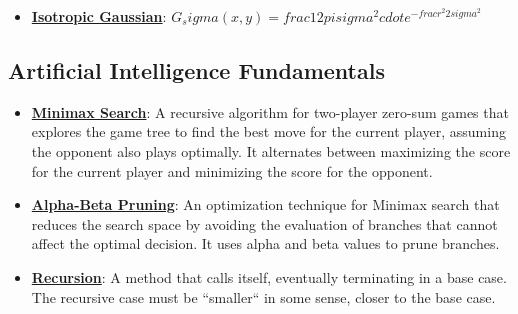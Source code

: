 \documentclass{article}%
\begin{document}
\begin{itemize}[leftmargin=*]
\item \href{https://purdue.brightspace.com/d2l/common/assets/pdfjs-d2l-dist/1.0.14-legacy/web/viewer.html?file=\%2Fcontent\%2Fenforced\%2F1095467-wl.202510.CS.24300.001\%2F08L2-Feature Extraction.pdf\%3Fou\%3D1095467\&lang=en-us\&container=d2l-fileviewer-rendered-pdf\&fullscreen=d2l-fileviewer-rendered-pdf-dialog\&height=667#page=43}{\textbf{Isotropic Gaussian}}: $G_ sigma(x, y) =  frac{1}{2 pi sigma^2}  cdot e^{- frac{r^2}{2 sigma^2}}$%
\end{itemize}

%
\subsection{Artificial Intelligence Fundamentals}%
\label{subsec:ArtificialIntelligenceFundamentals}%
\begin{itemize}[leftmargin=*]%
\item \href{https://purdue.brightspace.com/d2l/common/assets/pdfjs-d2l-dist/1.0.14-legacy/web/viewer.html?file=\%2Fcontent\%2Fenforced\%2F1095467-wl.202510.CS.24300.001\%2F02L2-Intro.pdf\%3Fou\%3D1095467\&lang=en-us\&container=d2l-fileviewer-rendered-pdf\&fullscreen=d2l-fileviewer-rendered-pdf-dialog\&height=667#page=22}{\textbf{Minimax Search}}: A recursive algorithm for two-player zero-sum games that explores the game tree to find the best move for the current player, assuming the opponent also plays optimally. It alternates between maximizing the score for the current player and minimizing the score for the opponent.%
\item \href{https://purdue.brightspace.com/d2l/common/assets/pdfjs-d2l-dist/1.0.14-legacy/web/viewer.html?file=\%2Fcontent\%2Fenforced\%2F1095467-wl.202510.CS.24300.001\%2F02L2-Intro.pdf\%3Fou\%3D1095467\&lang=en-us\&container=d2l-fileviewer-rendered-pdf\&fullscreen=d2l-fileviewer-rendered-pdf-dialog\&height=667#page=23}{\textbf{Alpha-Beta Pruning}}: An optimization technique for Minimax search that reduces the search space by avoiding the evaluation of branches that cannot affect the optimal decision. It uses alpha and beta values to prune branches.%
\item \href{https://purdue.brightspace.com/d2l/common/assets/pdfjs-d2l-dist/1.0.14-legacy/web/viewer.html?file=\%2Fcontent\%2Fenforced\%2F1095467-wl.202510.CS.24300.001\%2F14L1-DepthFS.pdf\%3Fou\%3D1095467\&lang=en-us\&container=d2l-fileviewer-rendered-pdf\&fullscreen=d2l-fileviewer-rendered-pdf-dialog\&height=667#page=3}{\textbf{Recursion}}: A method that calls itself, eventually terminating in a base case. The recursive case must be ``smaller`` in some sense, closer to the base case.%

\end{itemize}
\end{document}
